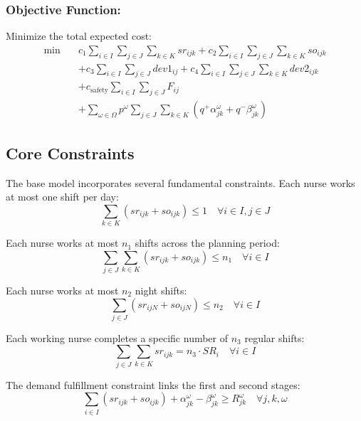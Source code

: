 \documentclass[10pt,a4paper,twocolumn]{article}
\begin{document}
\subsubsection{Objective Function:} 
Minimize the total expected cost:
\begin{equation}
\begin{aligned}
\min \quad 
& c_1 \sum_{i \in I}\sum_{j \in J}\sum_{k \in K} sr_{ijk} 
+ c_2 \sum_{i \in I}\sum_{j \in J}\sum_{k \in K} so_{ijk} \\
& + c_3 \sum_{i \in I}\sum_{j \in J} dev1_{ij} 
+ c_4 \sum_{i \in I}\sum_{j \in J}\sum_{k \in K} dev2_{ijk} \\
& + c_{\text{safety}} \sum_{i \in I}\sum_{j \in J} F_{ij} \\
& + \sum_{\omega \in \Omega} p^{\omega} 
   \sum_{j \in J}\sum_{k \in K} 
   \left( q^+ \alpha_{jk}^{\omega} + q^- \beta_{jk}^{\omega} \right)
\end{aligned}
\end{equation}
\subsection{Core Constraints}

The base model incorporates several fundamental constraints. Each nurse works at most one shift per day:
\begin{equation}
\sum_{k \in K} (sr_{ijk} + so_{ijk}) \leq 1 \quad \forall i \in I, j \in J
\end{equation}

Each nurse works at most $n_1$ shifts across the planning period:
\begin{equation}
\sum_{j \in J}\sum_{k \in K} \left( sr_{ijk} + so_{ijk} \right) \leq n_1 
\quad \forall i \in I
\end{equation}

Each nurse works at most $n_2$ night shifts:
\begin{equation}
\sum_{j \in J} (sr_{ijN} + so_{ijN}) \leq n_2 \quad \forall i \in I
\end{equation}

Each working nurse completes a specific number of $n_3$ regular shifts:
\begin{equation}
\sum_{j \in J}\sum_{k \in K} sr_{ijk} = n_3 \cdot SR_i 
\quad \forall i \in I
\end{equation}

The demand fulfillment constraint links the first and second stages:
\begin{equation}
\sum_{i \in I} (sr_{ijk} + so_{ijk}) + \alpha_{jk}^{\omega} - \beta_{jk}^{\omega} \geq R_{jk}^{\omega} \quad \forall j, k, \omega
\end{equation}
\end{document}
